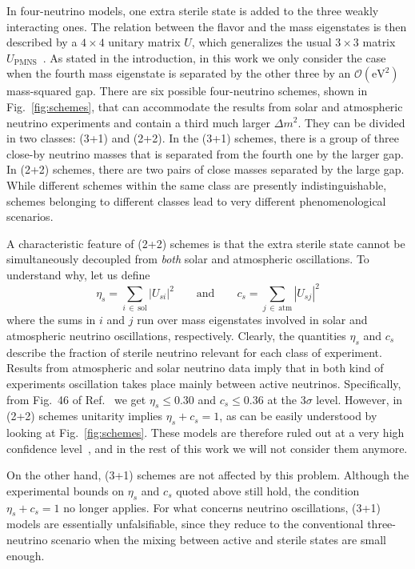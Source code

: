 \documentclass[12pt]{elsart}
\newcommand{\eVq}{\ensuremath{\text{eV}^2}}
\begin{document}
In four-neutrino models, one extra sterile state is added to the three
weakly interacting ones. The relation between the flavor and the mass
eigenstates is then described by a $4 \times 4$ unitary matrix $U$,
which generalizes the usual $3 \times 3$ matrix
$U_\text{PMNS}$~\cite{Pontecorvo:1957cp, Maki:1962mu,
Pontecorvo:1967fh, Gribov:1968kq}.
%
As stated in the introduction, in this work we only consider the case
when the fourth mass eigenstate is separated by the other three by an
$\mathcal{O}(\eVq)$ mass-squared gap. There are six possible
four-neutrino schemes, shown in Fig.~\ref{fig:schemes}, that can
accommodate the results from solar and atmospheric neutrino
experiments and contain a third much larger $\Delta m^2$.  They can be
divided in two classes: (3+1) and (2+2). In the (3+1) schemes, there
is a group of three close-by neutrino masses that is separated from
the fourth one by the larger gap.  In (2+2) schemes, there are two
pairs of close masses separated by the large gap. While different
schemes within the same class are presently indistinguishable, schemes
belonging to different classes lead to very different phenomenological
scenarios.

A characteristic feature of (2+2) schemes is that the extra sterile
state cannot be simultaneously decoupled from \emph{both} solar and
atmospheric oscillations. To understand why, let us define
%
\begin{equation}
    \eta_s = \sum_{i \,\in\, \text{sol}} |U_{s i}|^2
    \qquad\text{and}\qquad
    c_s = \sum_{j \,\in\, \text{atm}} |U_{s j}|^2
\end{equation}
%
where the sums in $i$ and $j$ run over mass eigenstates involved in
solar and atmospheric neutrino oscillations, respectively. Clearly,
the quantities $\eta_s$ and $c_s$ describe the fraction of sterile
neutrino relevant for each class of experiment. 
%
Results from atmospheric and solar neutrino data imply that in both
kind of experiments oscillation takes place mainly between active
neutrinos. Specifically, from Fig.~46 of
Ref.~\cite{GonzalezGarcia:2007ib} we get $\eta_s \le 0.30$ and $c_s
\le 0.36$ at the $3\sigma$ level. However, in (2+2) schemes unitarity
implies $\eta_s + c_s = 1$, as can be easily understood by looking at
Fig.~\ref{fig:schemes}. These models are therefore ruled out at a very
high confidence level~\cite{Maltoni:2002ni}, and in the rest of this
work we will not consider them anymore.

On the other hand, (3+1) schemes are not affected by this problem.
Although the experimental bounds on $\eta_s$ and $c_s$ quoted above
still hold, the condition $\eta_s + c_s = 1$ no longer applies. For
what concerns neutrino oscillations, (3+1) models are essentially
unfalsifiable, since they reduce to the conventional three-neutrino
scenario when the mixing between active and sterile states are small
enough.
\end{document}
